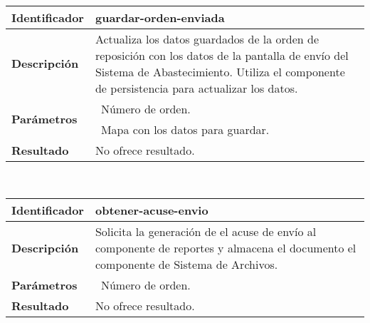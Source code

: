 	\vspace{5mm}\\
	\begin{tabular}{|p{}|p{}|}
		\hline
		\textbf{Identificador}	& \textbf{guardar-orden-enviada}\\
		\hline
		\hline
		\textbf{Descripción}	& Actualiza los datos guardados de la orden de reposición con los datos de la pantalla de envío del Sistema de Abastecimiento. Utiliza el componente de persistencia para actualizar los datos.\\
		\hline
		\multirow{2}{*}{\textbf{Parámetros}}	& \textbullet\, Número de orden.\\
												& \textbullet\, Mapa con los datos para guardar.\\
		\hline
		\textbf{Resultado}		& No ofrece resultado.\\
		\hline
	\end{tabular}
	\vspace{5mm}\\
	\begin{tabular}{|p{}|p{}|}
		\hline
		\textbf{Identificador}	& \textbf{obtener-acuse-envio}\\
		\hline
		\hline
		\textbf{Descripción}	& Solicita la generación de el acuse de envío al componente de reportes y almacena el documento el componente de Sistema de Archivos.\\
		\hline
		\textbf{Parámetros}		& \textbullet\, Número de orden.\\
		\hline
		\textbf{Resultado}		& No ofrece resultado.\\
		\hline
	\end{tabular}
	\vspace{5mm}
